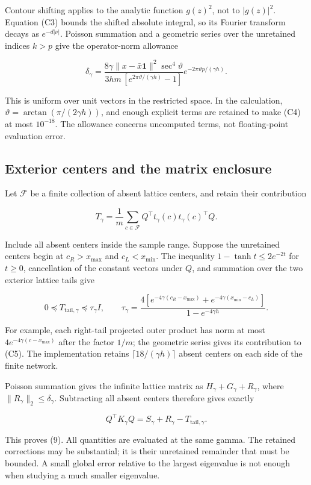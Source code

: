 \documentclass[11pt]{article}
\begin{document}
Contour shifting applies to the analytic function \(g(z)^2\), not to \(|g(z)|^2\). Equation (C3) bounds the shifted absolute integral, so its Fourier transform decays as \(e^{-d|\nu|}\). Poisson summation and a geometric series over the unretained indices \(k>p\) give the operator-norm allowance

\[
\boxed{
\delta_\gamma=
\frac{8\gamma\|x-\bar x\mathbf1\|^2\sec^4\vartheta}
{3hm\,[e^{2\pi\vartheta/(\gamma h)}-1]}
e^{-2\pi\vartheta p/(\gamma h)}.
}
\tag{C4}
\]

This is uniform over unit vectors in the restricted space. In the calculation, \(\vartheta=\arctan(\pi/(2\gamma h))\), and enough explicit terms are retained to make (C4) at most \(10^{-18}\). The allowance concerns uncomputed terms, not floating-point evaluation error.

\subsection{Exterior centers and the matrix enclosure}

Let \(\mathcal F\) be a finite collection of absent lattice centers, and retain their contribution

\[
T_\gamma=\frac1m\sum_{c\in\mathcal F}
Q^\top t_\gamma(c)t_\gamma(c)^\top Q.
\]

Include all absent centers inside the sample range. Suppose the unretained centers begin at \(c_R>x_{\max}\) and \(c_L<x_{\min}\). The inequality \(1-\tanh t\le2e^{-2t}\) for \(t\ge0\), cancellation of the constant vectors under \(Q\), and summation over the two exterior lattice tails give

\[
0\preceq T_{\mathrm{tail},\gamma}\preceq\tau_\gamma I,
\qquad
\tau_\gamma=
\frac{4[e^{-4\gamma(c_R-x_{\max})}+e^{-4\gamma(x_{\min}-c_L)}]}
{1-e^{-4\gamma h}}.
\tag{C5}
\]

For example, each right-tail projected outer product has norm at most \(4e^{-4\gamma(c-x_{\max})}\) after the factor \(1/m\); the geometric series gives its contribution to (C5). The implementation retains \(\lceil18/(\gamma h)\rceil\) absent centers on each side of the finite network.

Poisson summation gives the infinite lattice matrix as \(H_\gamma+G_\gamma+R_\gamma\), where \(\|R_\gamma\|_2\le\delta_\gamma\). Subtracting all absent centers therefore gives exactly

\[
Q^\top K_\gamma Q
=S_\gamma+R_\gamma-T_{\mathrm{tail},\gamma}.
\]

This proves (9). All quantities are evaluated at the same gamma. The retained corrections may be substantial; it is their unretained remainder that must be bounded. A small global error relative to the largest eigenvalue is not enough when studying a much smaller eigenvalue.
\end{document}
